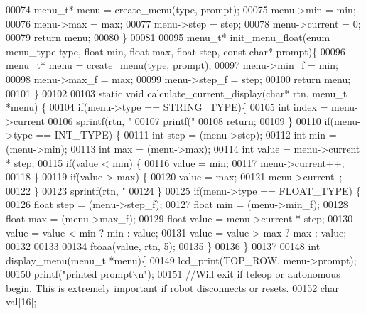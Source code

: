 \begin{DoxyCode}
{00074   menu_t* menu = create_menu(type, prompt);
00075   menu->min = min;
00076   menu->max = max;
00077   menu->step = step;
00078   menu->current = 0;
00079   \textcolor{keywordflow}{return} menu;
00080 \}
00081 
00095 menu_t* init_menu_float(\textcolor{keyword}{enum} menu_type type, \textcolor{keywordtype}{float} min, \textcolor{keywordtype}{float} max, \textcolor{keywordtype}{float} step, \textcolor{keyword}{const} \textcolor{keywordtype}{char}* prompt)\{
00096   menu_t* menu = create_menu(type, prompt);
00097   menu->min_f = min;
00098   menu->max_f = max;
00099   menu->step_f = step;
00100   \textcolor{keywordflow}{return} menu;
00101 \}
00102 
00103 \textcolor{keyword}{static} \textcolor{keywordtype}{void} calculate_current_display(\textcolor{keywordtype}{char}* rtn, menu_t *menu) \{
00104   \textcolor{keywordflow}{if}(menu->type == STRING_TYPE)\{
00105   \textcolor{keywordtype}{int} index = menu->current %
00106   sprintf(rtn, \textcolor{stringliteral}{"%
00107   printf(\textcolor{stringliteral}{"%
00108   \textcolor{keywordflow}{return};
00109   \}
00110   \textcolor{keywordflow}{if}(menu->type == INT_TYPE) \{
00111     \textcolor{keywordtype}{int} step = (menu->step);
00112     \textcolor{keywordtype}{int} min = (menu->min);
00113     \textcolor{keywordtype}{int} max = (menu->max);
00114     \textcolor{keywordtype}{int} value = menu->current * step;
00115     \textcolor{keywordflow}{if}(value < min) \{
00116       value = min;
00117       menu->current++;
00118     \}
00119     \textcolor{keywordflow}{if}(value > max) \{
00120       value = max;
00121       menu->current--;
00122     \}
00123     sprintf(rtn, \textcolor{stringliteral}{"%
00124   \}
00125   \textcolor{keywordflow}{if}(menu->type == FLOAT_TYPE) \{
00126     \textcolor{keywordtype}{float} step = (menu->step_f);
00127     \textcolor{keywordtype}{float} min = (menu->min_f);
00128     \textcolor{keywordtype}{float} max = (menu->max_f);
00129     \textcolor{keywordtype}{float} value = menu->current * step;
00130     value = value < min ? min : value;
00131     value = value > max ? max : value;
00132 
00133 
00134     ftoaa(value, rtn, 5);
00135   \}
00136 \}
00137 
00148 \textcolor{keywordtype}{int} display_menu(menu_t *menu)\{
00149   lcd_print(TOP_ROW, menu->prompt);
00150   printf(\textcolor{stringliteral}{"printed prompt\(\backslash\)n"});
00151   \textcolor{comment}{//Will exit if teleop or autonomous begin. This is extremely important if robot disconnects or resets.}
00152   \textcolor{keywordtype}{char} val[16];
}}}}
\end{DoxyCode}
